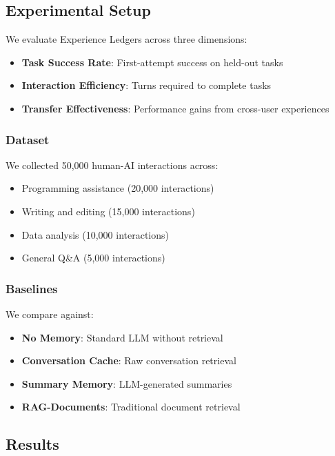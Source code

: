\documentclass[11pt,letterpaper]{article}
\begin{document}
\subsection{Experimental Setup}

We evaluate Experience Ledgers across three dimensions:

\begin{itemize}
    \item \textbf{Task Success Rate}: First-attempt success on held-out tasks
    \item \textbf{Interaction Efficiency}: Turns required to complete tasks
    \item \textbf{Transfer Effectiveness}: Performance gains from cross-user experiences
\end{itemize}

\subsubsection{Dataset}

We collected 50,000 human-AI interactions across:
\begin{itemize}
    \item Programming assistance (20,000 interactions)
    \item Writing and editing (15,000 interactions)
    \item Data analysis (10,000 interactions)
    \item General Q\&A (5,000 interactions)
\end{itemize}

\subsubsection{Baselines}

We compare against:
\begin{itemize}
    \item \textbf{No Memory}: Standard LLM without retrieval
    \item \textbf{Conversation Cache}: Raw conversation retrieval
    \item \textbf{Summary Memory}: LLM-generated summaries
    \item \textbf{RAG-Documents}: Traditional document retrieval
\end{itemize}

\subsection{Results}
\end{document}
